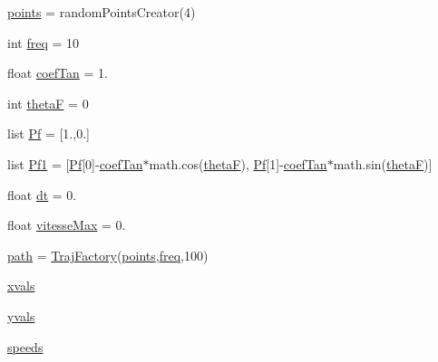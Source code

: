 \begin{DoxyCompactItemize}
\item 
\hyperlink{namespacecmd__TTB_1_1trajFactory_a155b2c6da96a917f0ac2ad1b45e68f65}{points} = random\+Points\+Creator(4)
\item 
int \hyperlink{namespacecmd__TTB_1_1trajFactory_abb2e2587a58c4fc35dd18e79526c3a67}{freq} = 10
\item 
float \hyperlink{namespacecmd__TTB_1_1trajFactory_a31f0c63eecd9cb034f7db3c30fc94a1b}{coef\+Tan} = 1.
\item 
int \hyperlink{namespacecmd__TTB_1_1trajFactory_ac0c9d7799ff61a3cfe3128872918c3d2}{thetaF} = 0
\item 
list \hyperlink{namespacecmd__TTB_1_1trajFactory_aa5408e0df737a89e02b70bae38dabdf5}{Pf} = \mbox{[}1.,0.\mbox{]}
\item 
list \hyperlink{namespacecmd__TTB_1_1trajFactory_a99ccef9f51bec12c2c7ed06cb5dd9d3a}{Pf1} = \mbox{[}\hyperlink{namespacecmd__TTB_1_1trajFactory_aa5408e0df737a89e02b70bae38dabdf5}{Pf}\mbox{[}0\mbox{]}-\/\hyperlink{namespacecmd__TTB_1_1trajFactory_a31f0c63eecd9cb034f7db3c30fc94a1b}{coef\+Tan}$\ast$math.\+cos(\hyperlink{namespacecmd__TTB_1_1trajFactory_ac0c9d7799ff61a3cfe3128872918c3d2}{thetaF}), \hyperlink{namespacecmd__TTB_1_1trajFactory_aa5408e0df737a89e02b70bae38dabdf5}{Pf}\mbox{[}1\mbox{]}-\/\hyperlink{namespacecmd__TTB_1_1trajFactory_a31f0c63eecd9cb034f7db3c30fc94a1b}{coef\+Tan}$\ast$math.\+sin(\hyperlink{namespacecmd__TTB_1_1trajFactory_ac0c9d7799ff61a3cfe3128872918c3d2}{thetaF})\mbox{]}
\item 
float \hyperlink{namespacecmd__TTB_1_1trajFactory_a40f972381ea23fa3614767994e20909e}{dt} = 0.
\item 
float \hyperlink{namespacecmd__TTB_1_1trajFactory_a25697213c9c1b12b56e1d9cb2b488f6d}{vitesse\+Max} = 0.
\item 
\hyperlink{namespacecmd__TTB_1_1trajFactory_a377dd717e6d99f94f3bd8359315ce8f2}{path} = \hyperlink{classcmd__TTB_1_1trajFactory_1_1TrajFactory}{Traj\+Factory}(\hyperlink{namespacecmd__TTB_1_1trajFactory_a155b2c6da96a917f0ac2ad1b45e68f65}{points},\hyperlink{namespacecmd__TTB_1_1trajFactory_abb2e2587a58c4fc35dd18e79526c3a67}{freq},100)
\item 
\hyperlink{namespacecmd__TTB_1_1trajFactory_ac955d640aed48051089654bf294a2001}{xvals}
\item 
\hyperlink{namespacecmd__TTB_1_1trajFactory_a7a877f7cdb271eb3276d034ab078d600}{yvals}
\item 
\hyperlink{namespacecmd__TTB_1_1trajFactory_a6c2b69f01c79170fee15a08f7d7be3c5}{speeds}

\end{DoxyCompactItemize}
